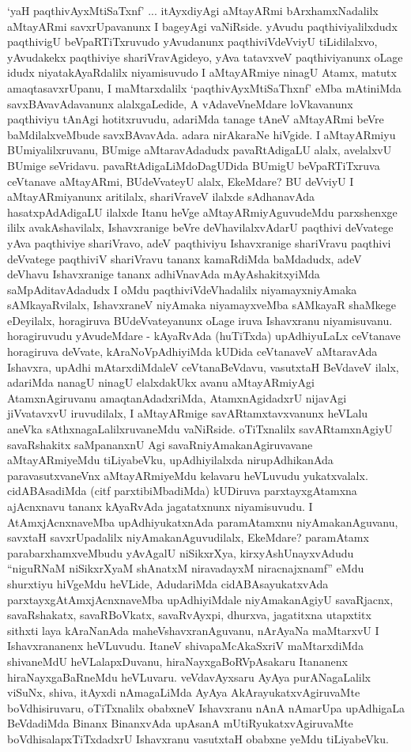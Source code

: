 \begin{artha}
`yaH paqthivAyxMtiSaTxnf' ... itAyxdiyAgi aMtayARmi bArxhamxNadalilx aMtayARmi savxrUpavanunx I bageyAgi vaNiRside. yAvudu paqthiviyalilxdudx paqthivigU beVpaRTiTxruvudo yAvudanunx paqthiviVdeVviyU tiLidilalxvo, yAvudakekx paqthiviye shariVravAgideyo, yAva tatavxveV paqthiviyanunx oLage idudx niyatakAyaRdalilx niyamisuvudo I aMtayARmiye ninagU Atamx, matutx amaqtasavxrUpanu, I maMtarxdalilx `paqthivAyxMtiSaThxnf' eMba mAtiniMda savxBAvavAdavanunx alalxgaLedide, A vAdaveVneMdare loVkavanunx paqthiviyu tAnAgi hotitxruvudu, adariMda tanage tAneV aMtayARmi beVre baMdilalxveMbude savxBAvavAda. adara nirAkaraNe hiVgide. I aMtayARmiyu BUmiyalilxruvanu, BUmige aMtaravAdadudx pavaRtAdigaLU alalx, avelalxvU BUmige seVridavu. pavaRtAdigaLiMdoDagUDida BUmigU beVpaRTiTxruva ceVtanave aMtayARmi, BUdeVvateyU alalx, EkeMdare? BU deVviyU I aMtayARmiyanunx aritilalx, shariVraveV ilalxde sAdhanavAda hasatxpAdAdigaLU ilalxde Itanu heVge aMtayARmiyAguvudeMdu parxshenxge ililx avakAshavilalx, Ishavxranige beVre deVhavilalxvAdarU paqthivi deVvatege yAva paqthiviye shariVravo, adeV paqthiviyu Ishavxranige shariVravu paqthivi deVvatege paqthiviV shariVravu tananx kamaRdiMda baMdadudx, adeV deVhavu Ishavxranige tananx adhiVnavAda mAyAshakitxyiMda saMpAditavAdadudx I oMdu paqthiviVdeVhadalilx niyamayxniyAmaka sAMkayaRvilalx, IshavxraneV niyAmaka niyamayxveMba sAMkayaR shaMkege eDeyilalx, horagiruva BUdeVvateyanunx oLage iruva Ishavxranu niyamisuvanu. horagiruvudu yAvudeMdare - kAyaRvAda (huTiTxda) upAdhiyuLaLx ceVtanave horagiruva deVvate, kAraNoVpAdhiyiMda kUDida  ceVtanaveV aMtaravAda Ishavxra, upAdhi mAtarxdiMdaleV ceVtanaBeVdavu, vasutxtaH BeVdaveV ilalx, adariMda nanagU ninagU elalxdakUkx avanu aMtayARmiyAgi AtamxnAgiruvanu amaqtanAdadxriMda, AtamxnAgidadxrU nijavAgi jiVvatavxvU iruvudilalx, I aMtayARmige savARtamxtavxvanunx heVLalu aneVka sAthxnagaLalilxruvaneMdu vaNiRside. oTiTxnalilx savARtamxnAgiyU savaRshakitx saMpananxnU Agi savaRniyAmakanAgiruvavane aMtayARmiyeMdu tiLiyabeVku, upAdhiyilalxda nirupAdhikanAda paravasutxvaneVnx aMtayARmiyeMdu kelavaru heVLuvudu yukatxvalalx. cidABAsadiMda (citf parxtibiMbadiMda) kUDiruva parxtayxgAtamxna ajAcnxnavu tananx kAyaRvAda jagatatxnunx niyamisuvudu. I AtAmxjAcnxnaveMba upAdhiyukatxnAda paramAtamxnu niyAmakanAguvanu, savxtaH savxrUpadalilx niyAmakanAguvudilalx, EkeMdare? paramAtamx parabarxhamxveMbudu yAvAgalU niSikxrXya, kirxyAshUnayxvAdudu ``niguRNaM niSikxrXyaM shAnatxM niravadayxM niracnajxnamf'' eMdu shurxtiyu hiVgeMdu heVLide, AdudariMda cidABAsayukatxvAda parxtayxgAtAmxjAcnxnaveMba upAdhiyiMdale niyAmakanAgiyU savaRjacnx, savaRshakatx, savaRBoVkatx, savaRvAyxpi, dhurxva, jagatitxna utapxtitx sithxti laya kAraNanAda maheVshavxranAguvanu, nArAyaNa maMtarxvU I Ishavxrananenx heVLuvudu. ItaneV shivapaMcAkaSxriV maMtarxdiMda shivaneMdU heVLalapxDuvanu, hiraNayxgaBoRVpAsakaru Itananenx hiraNayxgaBaRneMdu heVLuvaru. veVdavAyxsaru AyAya purANagaLalilx viSuNx, shiva, itAyxdi nAmagaLiMda AyAya AkArayukatxvAgiruvaMte boVdhisiruvaru, oTiTxnalilx obabxneV Ishavxranu nAnA nAmarUpa upAdhigaLa BeVdadiMda Binanx BinanxvAda upAsanA mUtiRyukatxvAgiruvaMte boVdhisalapxTiTxdadxrU Ishavxranu vasutxtaH obabxne yeMdu tiLiyabeVku.
\end{artha}

